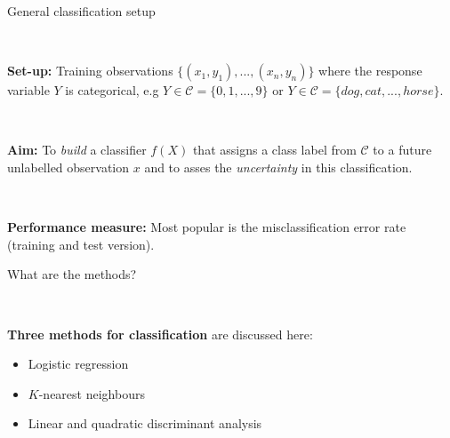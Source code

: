 \documentclass[10pt,ignorenonframetext,]{beamer}
\begin{document}
\begin{frame}

\begin{block}{General classification setup}

\(~\)

\textbf{Set-up:} Training observations
\(\{(x_1, y_1), ..., (x_n, y_n)\}\) where the response variable \(Y\) is
categorical, e.g \(Y \in \mathcal{C} = \{0, 1, ..., 9\}\) or
\(Y \in \mathcal{C} = \{dog, cat,... ,horse\}\).

\(~\)

\textbf{Aim: } To \emph{build} a classifier \(f(X)\) that assigns a
class label from \(\mathcal{C}\) to a future unlabelled observation
\(x\) and to asses the \emph{uncertainty} in this classification.

\(~\)

\textbf{Performance measure:} Most popular is the misclassification
error rate (training and test version).

\end{block}

\end{frame}

\begin{frame}

\begin{block}{What are the methods?}

\(~\)

\textbf{Three methods for classification} are discussed here:

\begin{itemize}
\item
  Logistic regression
\item
  \(K\)-nearest neighbours
\item
  Linear and quadratic discriminant analysis
\end{itemize}

\end{block}

\end{frame}
\end{document}
